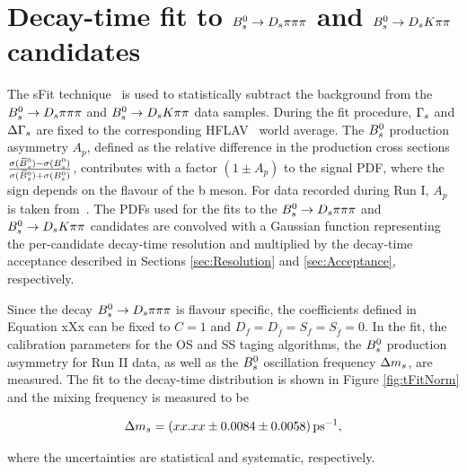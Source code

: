 \section{Decay-time fit to ${{B}^0_{s}}\rightarrow{\ensuremath{{D}_{s}}}{\ensuremath{\pi}}{\ensuremath{\pi}}{\ensuremath{\pi}}$ and ${{B}^0_{s}}\rightarrow{\ensuremath{{D}_{s}}}{\ensuremath{K}}{\ensuremath{\pi}}{\ensuremath{\pi}}$ candidates}
\label{sec:timeFit}

The sFit technique~\cite{Pivk:2004ty} is used to statistically subtract the background from the ${{B}^0_{s}}\rightarrow{\ensuremath{{D}_{s}}}{\ensuremath{\pi}}{\ensuremath{\pi}}{\ensuremath{\pi}}$ and ${{B}^0_{s}}\rightarrow{\ensuremath{{D}_{s}}}{\ensuremath{K}}{\ensuremath{\pi}}{\ensuremath{\pi}}$ data samples. 
During the fit procedure, ${\Gamma_{{s}}}$ and ${\Delta\Gamma_{{s}}}$ are fixed to the corresponding HFLAV~\cite{HFAG} world average.
The ${{B}^0_{s}}$ production asymmetry $A_{p}$, defined as the relative difference in the production cross sections $\frac{\sigma({{\kern 0.18em\overline{\kern -0.18em B}{}}{}^0_{s}}) - \sigma({{B}^0_{s}})}{\sigma({{\kern 0.18em\overline{\kern -0.18em B}{}}{}^0_{s}}) + \sigma({{B}^0_{s}})}$, contributes with a factor $(1 \pm A_{p})$ to the signal PDF,
where the sign depends on the flavour of the b meson. 
For data recorded during Run I, $A_{p}$ is taken from~\cite{Aaij:2017mso}.
The PDFs used for the fits to the ${{B}^0_{s}}\rightarrow{\ensuremath{{D}_{s}}}{\ensuremath{\pi}}{\ensuremath{\pi}}{\ensuremath{\pi}}$ and ${{B}^0_{s}}\rightarrow{\ensuremath{{D}_{s}}}{\ensuremath{K}}{\ensuremath{\pi}}{\ensuremath{\pi}}$ candidates are convolved with a Gaussian function representing the per-candidate decay-time resolution 
and multiplied by the decay-time acceptance described in Sections \ref{sec:Resolution} and \ref{sec:Acceptance}, respectively.\newline

Since the decay ${{B}^0_{s}}\rightarrow{\ensuremath{{D}_{s}}}{\ensuremath{\pi}}{\ensuremath{\pi}}{\ensuremath{\pi}}$ is flavour specific, the \CP coefficients defined in Equation xXx can be fixed to $C=1$ and $D_{f} = D_{\bar{f}} = S_{f} = S_{\bar{f}} = 0$. 
In the fit, the calibration parameters for the OS and SS taging algorithms, the ${{B}^0_{s}}$ production asymmetry for Run II data, as well as the ${{B}^0_{s}}$ oscillation frequency ${\Delta m_{{s}}}$, are measured.  
The fit to the decay-time distribution is shown in Figure \ref{fig:tFitNorm} and the mixing frequency is measured to be %

\begin{equation}
\Delta m_{s} = (xx.xx \pm 0.0084 \pm 0.0058)\text{\,ps}^{-1}, 
\end{equation}

where the uncertainties are statistical and systematic, respectively.

%        


